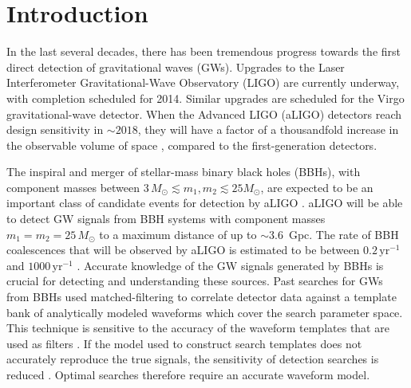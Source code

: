 \documentclass[aps,
prd,
amsmath,
amssymb,
twocolumn,
floatfix,
groupedaddress]{revtex4-1}
\begin{document}
\section{Introduction}\label{sec:level1:Introduction}
In the last several decades, there has been tremendous progress towards the
first direct detection of gravitational waves (GWs). Upgrades to the Laser
Interferometer Gravitational-Wave Observatory (LIGO) are currently underway,
with completion scheduled for 2014. Similar upgrades are scheduled for the
Virgo gravitational-wave detector. When the Advanced LIGO (aLIGO) detectors
reach design sensitivity in $\sim 2018$, they will have a factor of a
thousandfold increase in the observable volume of space
\citep{aLIGOsensitivity}, compared to the first-generation detectors.

The inspiral and merger of stellar-mass binary black holes (BBHs), with component masses between $3 \, M_{\odot} \lesssim m_1, m_2 \lesssim 25 M_{\odot}$, are expected to be an important class of candidate events
for detection by aLIGO \citep{300yrsofGravitation}. aLIGO will be able to
detect GW signals from BBH systems with component masses $m_1 = m_2 = 25 \,
M_{\odot}$ to a maximum distance of up to $\sim 3.6$~Gpc. The rate of BBH
coalescences that will be observed by aLIGO is estimated to be
between $0.2\,\mathrm{yr}^{-1}$ and $1000\,\mathrm{yr}^{-1}$
\citep{LSCCBCRates2010}.
Accurate knowledge of the GW signals generated by BBHs is crucial for
detecting and understanding these sources. Past searches for GWs from BBHs
\citep{Colaboration:2011nz,Abadie:2010yb,Abbott:2009qj,Abbott:2009tt,Messaritaki:2005wv} used matched-filtering
\citep{Wainstein:1962,Allen:2005fk} to correlate detector data against a template bank of
analytically modeled waveforms which cover the search parameter space. This
technique is sensitive to the accuracy of the waveform templates that are used
as filters \citep{FittingFactorApostolatos}. If the model used to construct
search templates does not accurately reproduce the true signals, the
sensitivity of detection searches is reduced
\citep{WaveformAccuracy2008,WaveformAccuracy2010}. Optimal searches therefore
require an accurate waveform model.
\end{document}
